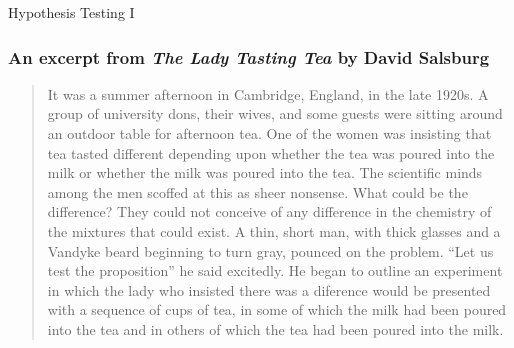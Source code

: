 \documentclass[handout]{beamer}
\date{Lecture 20}
\begin{document}
 





\begin{frame}[plain]
	\titlepage 
	

\end{frame} 



\begin{frame}
\begin{center}
\Huge Hypothesis Testing I
\end{center}
\end{frame}

\begin{frame}
\frametitle{An excerpt from \emph{The Lady Tasting Tea} by David Salsburg}
\footnotesize
\begin{quote}
It was a summer afternoon in Cambridge, England, in the late 1920s. A group of university dons, their wives, and some guests were sitting around an outdoor table for afternoon tea. One of the women was insisting that tea tasted different depending upon whether the tea was poured into the milk or whether the milk was poured into the tea. The scientific minds among the men scoffed at this as sheer nonsense. What could be the difference? They could not conceive of any difference in the chemistry of the mixtures that could exist. A thin, short man, with thick glasses and a Vandyke beard beginning to turn gray, pounced on the problem. ``Let us test the proposition'' he said excitedly. He began to outline an experiment in which the lady who insisted there was a diference would be presented with a sequence of cups of tea, in some of which the milk had been poured into the tea and in others of which the tea had been poured into the milk.
\end{quote}
\end{frame}




\end{document}
